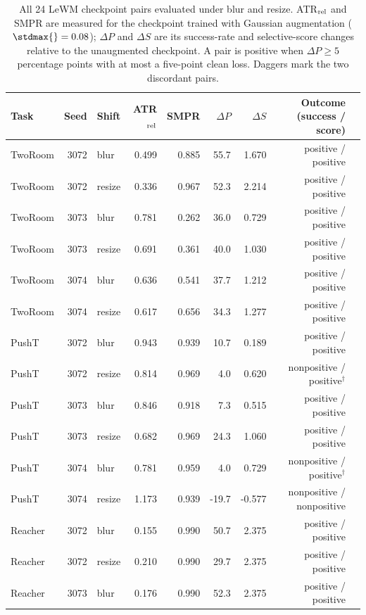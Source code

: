 \begin{table}[t]
\centering
\caption{All 24 LeWM checkpoint pairs evaluated under blur and resize. ATR$_{\rm rel}$ and SMPR are measured for the checkpoint trained with Gaussian augmentation ($\stdmax{}=0.08$); $\Delta P$ and $\Delta S$ are its success-rate and selective-score changes relative to the unaugmented checkpoint. A pair is positive when $\Delta P\geq5$ percentage points with at most a five-point clean loss. Daggers mark the two discordant pairs.}
\label{tab:cross-stressor-all-pairs}
\footnotesize
\setlength{\tabcolsep}{3pt}
\begin{tabular}{lrlrrrrrl}
\toprule
Task & Seed & Shift & ATR$_{\rm rel}$ & SMPR & $\Delta P$ & $\Delta S$ & Outcome (success / score) \\
\midrule
TwoRoom & 3072 & blur & 0.499 & 0.885 & 55.7 & 1.670 & positive / positive \\
TwoRoom & 3072 & resize & 0.336 & 0.967 & 52.3 & 2.214 & positive / positive \\
TwoRoom & 3073 & blur & 0.781 & 0.262 & 36.0 & 0.729 & positive / positive \\
TwoRoom & 3073 & resize & 0.691 & 0.361 & 40.0 & 1.030 & positive / positive \\
TwoRoom & 3074 & blur & 0.636 & 0.541 & 37.7 & 1.212 & positive / positive \\
TwoRoom & 3074 & resize & 0.617 & 0.656 & 34.3 & 1.277 & positive / positive \\
PushT & 3072 & blur & 0.943 & 0.939 & 10.7 & 0.189 & positive / positive \\
PushT & 3072 & resize & 0.814 & 0.969 & 4.0 & 0.620 & nonpositive / positive$^\dag$ \\
PushT & 3073 & blur & 0.846 & 0.918 & 7.3 & 0.515 & positive / positive \\
PushT & 3073 & resize & 0.682 & 0.969 & 24.3 & 1.060 & positive / positive \\
PushT & 3074 & blur & 0.781 & 0.959 & 4.0 & 0.729 & nonpositive / positive$^\dag$ \\
PushT & 3074 & resize & 1.173 & 0.939 & -19.7 & -0.577 & nonpositive / nonpositive \\
Reacher & 3072 & blur & 0.155 & 0.990 & 50.7 & 2.375 & positive / positive \\
Reacher & 3072 & resize & 0.210 & 0.990 & 29.7 & 2.375 & positive / positive \\
Reacher & 3073 & blur & 0.176 & 0.990 & 52.3 & 2.375 & positive / positive \\

\end{tabular}
\end{table}
